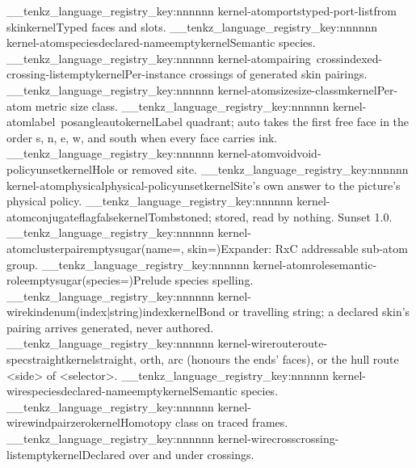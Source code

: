 \__tenkz_language_registry_key:nnnnnn {kernel-atom}{ports}{typed-port-list}{from skin}{kernel}{Typed faces and slots.}
\__tenkz_language_registry_key:nnnnnn {kernel-atom}{species}{declared-name}{empty}{kernel}{Semantic species.}
\__tenkz_language_registry_key:nnnnnn {kernel-atom}{pairing~cross}{indexed-crossing-list}{empty}{kernel}{Per-instance crossings of generated skin pairings.}
\__tenkz_language_registry_key:nnnnnn {kernel-atom}{size}{size-class}{m}{kernel}{Per-atom metric size class.}
\__tenkz_language_registry_key:nnnnnn {kernel-atom}{label~pos}{angle}{auto}{kernel}{Label quadrant; auto takes the first free face in the order s, n, e, w, and south when every face carries ink.}
\__tenkz_language_registry_key:nnnnnn {kernel-atom}{void}{void-policy}{unset}{kernel}{Hole or removed site.}
\__tenkz_language_registry_key:nnnnnn {kernel-atom}{physical}{physical-policy}{unset}{kernel}{Site's own answer to the picture's physical policy.}
\__tenkz_language_registry_key:nnnnnn {kernel-atom}{conjugate}{flag}{false}{kernel}{Tombstoned; stored, read by nothing. Sunset 1.0.}
\__tenkz_language_registry_key:nnnnnn {kernel-atom}{cluster}{pair}{empty}{sugar(name=, skin=)}{Expander: RxC addressable sub-atom group.}
\__tenkz_language_registry_key:nnnnnn {kernel-atom}{role}{semantic-role}{empty}{sugar(species=)}{Prelude species spelling.}
\__tenkz_language_registry_key:nnnnnn {kernel-wire}{kind}{enum(index|string)}{index}{kernel}{Bond or travelling string; a declared skin's pairing arrives generated, never authored.}
\__tenkz_language_registry_key:nnnnnn {kernel-wire}{route}{route-spec}{straight}{kernel}{straight, orth, arc (honours the ends' faces), or the hull route {<side> of <selector>}.}
\__tenkz_language_registry_key:nnnnnn {kernel-wire}{species}{declared-name}{empty}{kernel}{Semantic species.}
\__tenkz_language_registry_key:nnnnnn {kernel-wire}{wind}{pair}{zero}{kernel}{Homotopy class on traced frames.}
\__tenkz_language_registry_key:nnnnnn {kernel-wire}{cross}{crossing-list}{empty}{kernel}{Declared over and under crossings.}
